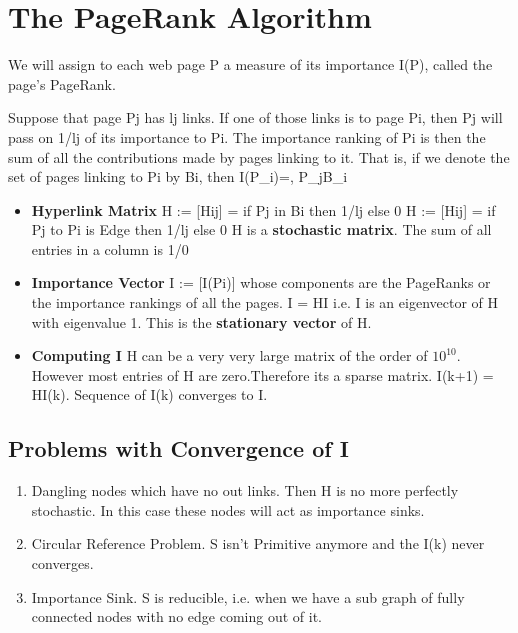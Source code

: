 \documentclass{article}
\begin{document}
    \section{The PageRank Algorithm}
    We will assign to each web page P a measure of its importance I(P), called the page's PageRank.

    Suppose that page Pj has lj links. If one of those links is to page Pi, then Pj will pass on 1/lj of its importance to
    Pi. The importance ranking of Pi is then the sum of all the contributions made by pages linking to it. That is, if we denote the set of pages linking to Pi by Bi, then I({P_i})=,   {P_j\in B_i}
    
    \begin{itemize}
        \item \textbf{Hyperlink Matrix} \newline
        H := [Hij] = if Pj in Bi then 1/lj else 0 \newline
        H := [Hij] = if Pj to Pi is Edge then 1/lj else 0 \newline
        H is a \textbf{stochastic matrix}. The sum of all entries in a column is 1/0
        
        \item \textbf{Importance Vector} \newline
        I := [I(Pi)] whose components are the PageRanks or the importance rankings of all the pages.\newline
        I = HI i.e. I is an eigenvector of H with eigenvalue 1. This is the \textbf{stationary vector} of H.
        
        \item \textbf{Computing I} \newline
        H can be a very very large matrix of the order of $10^10$. However most entries of H are zero.Therefore its a sparse matrix. \newline
        I(k+1) = HI(k). Sequence of I(k) converges to I.

    \end{itemize}
    
    \subsection{Problems with Convergence of I}
    \begin{enumerate}
        \item Dangling nodes which have no out links. Then H is no more perfectly stochastic. In this case these nodes will act as importance sinks.
        \item Circular Reference Problem. S isn't Primitive anymore and the I(k) never converges.
        \item Importance Sink. S is reducible, i.e. when we have a sub graph of fully connected nodes with no edge coming out of it.
    \end{enumerate}
    
\end{document}
